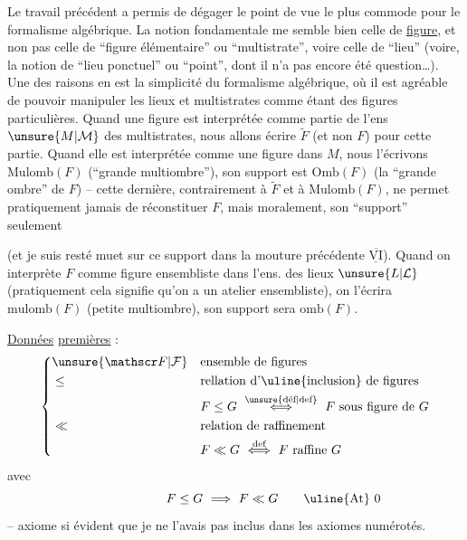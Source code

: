 Le travail précédent a permis de dégager le point de vue le plus commode pour le formalisme algébrique. La notion fondamentale me semble bien celle de \uline{figure}, et non pas celle de ``figure élémentaire'' ou ``multistrate'', voire celle de ``lieu'' (voire, la notion de ``lieu ponctuel'' ou ``point'', dont il n'a pas encore été question\ldots). Une des raisons en est la simplicité du formalisme algébrique,
%
 où il est agréable de pouvoir manipuler les lieux et multistrates comme étant des figures particulières. Quand une figure  est interprétée  comme partie de l'ens $\unsure{M|\mathcal M}$  des multistrates, nous allons écrire $\widetilde F$ (et non $F$) pour cette partie. Quand elle est interprétée comme une figure  dans $M$, nous l'écrivons $\mathrm{Mulomb}(F)$ (``grande multiombre''), son support est $\mathrm{Omb}(F)$ (la ``grande ombre'' de $F$) -- cette dernière, contrairement à $\widetilde F$ et à $\mathrm{Mulomb}(F)$, ne permet pratiquement jamais de réconstituer $F$,  mais moralement, son ``support'' seulement

(et je suis resté muet sur ce support dans la mouture précédente  $\underline{\overline{\mathrm{VI}}}$). Quand on interprète $F$ comme figure ensembliste dans l'ens. des lieux $\unsure{L|\mathcal L}$  (pratiquement cela signifie qu'on a un atelier ensembliste), on l'écrira $\mathrm{mulomb}(F)$ (petite multiombre), son support sera $\mathrm{omb}(F)$.

\uline{Données} \uline{premières} :
\[
\left\{\begin{aligned}
&\unsure{\mathscr F|\mathcal F} &&\text{ensemble de figures}\\
&\leq &&\text{rellation d'\uline{inclusion} de figures}\\
& &&F\leq G\ \overset{\text{\unsure{déf|def}}}{\Longleftrightarrow}\ F\ \text{sous figure de }G\\
&\ll &&\text{relation de raffinement}\\
& && F\ll G\ \overset{\text{def}}{\Longleftrightarrow}\ F\ \text{raffine }G
\end{aligned}\right.
\]
avec
\[
F\leq G\ \Longrightarrow\ F\ll G\tag*{\makebox[0pt][r]{\makebox[\displaywidth][l]{\uline{At} 0}}}
\]
-- axiome si évident que je ne l'avais pas inclus dans les axiomes numérotés.

